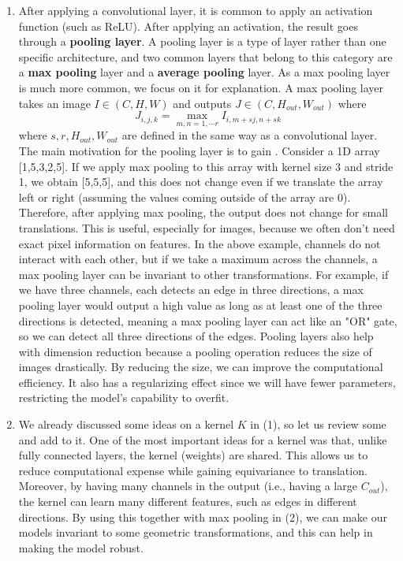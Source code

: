 \documentclass[
	12pt, %
]{../Template/fphw}
\begin{document}
\begin{enumerate}[label=(\arabic*)]
    \item After applying a convolutional layer, it is common to apply an activation function (such as ReLU). After applying an activation, the result goes through a \textbf{pooling layer}. A pooling layer is a type of layer rather than one specific architecture, and two common layers that belong to this category are a \textbf{max pooling} layer and a \textbf{average pooling} layer. As a max pooling layer is much more common, we focus on it for explanation. A max pooling layer takes an image $I\in (C,H,W)$ and outputs $J\in (C,H_{out},W_{out})$ where
    \begin{equation}
        J_{i,j,k} = \max_{m,n= 1,\cdots r} I_{i, m+sj, n+sk}
    \end{equation}
    where $s,r,H_{out},W_{out}$ are defined in the same way as a convolutional layer. The main motivation for the pooling layer is to gain . Consider a 1D array [1,5,3,2,5]. If we apply max pooling to this array with kernel size 3 and stride 1, we obtain [5,5,5], and this does not change even if we translate the array left or right (assuming the values coming outside of the array are $0$). Therefore, after applying max pooling, the output does not change for small translations. This is useful, especially for images, because we often don't need exact pixel information on features. In the above example, channels do not interact with each other, but if we take a maximum across the channels, a max pooling layer can be invariant to other transformations. For example, if we have three channels, each detects an edge in three directions, a max pooling layer would output a high value as long as at least one of the three directions is detected, meaning a max pooling layer can act like an "OR" gate, so we can detect all three directions of the edges. Pooling layers also help with dimension reduction because a pooling operation reduces the size of images drastically. By reducing the size, we can improve the computational efficiency. It also has a regularizing effect since we will have fewer parameters, restricting the model's capability to overfit.

    \item We already discussed some ideas on a kernel $K$ in (1), so let us review some and add to it. One of the most important ideas for a kernel was that, unlike fully connected layers, the kernel (weights) are shared. This allows us to reduce computational expense while gaining equivariance to translation. Moreover, by having many channels in the output (i.e., having a large $C_{out}$), the kernel can learn many different features, such as edges in different directions. By using this together with max pooling in (2), we can make our models invariant to some geometric transformations, and this can help in making the model robust.
    

\end{enumerate}
\end{document}
